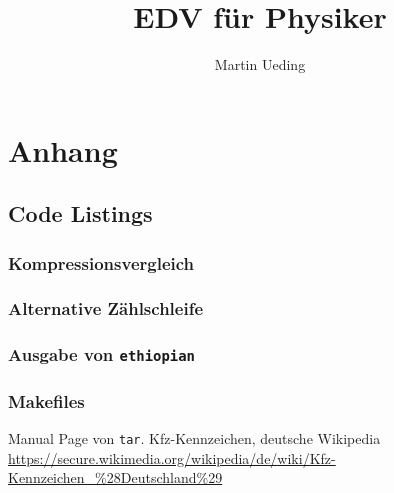 \documentclass[11pt]{report}
\title{EDV für Physiker}
\author{Martin Ueding}
\newcommand\gqq[1]{\glqq #1\grqq}
\begin{document}
\maketitle
\newpage

\tableofcontents
\newpage









\part{Anhang}
\begin{appendix}

\chapter{Code Listings}
\section{Kompressionsvergleich}
\label{listing:compression}


\section{Alternative Zählschleife}
\label{listing:zahlen2}


 


\section{Ausgabe von \texttt{ethiopian}}


\section{Makefiles}





\lstlistoflistings

\end{appendix}

\begin{thebibliography}{n}
 Manual Page von \texttt{tar}.
 \gqq{Kfz-Kennzeichen}, deutsche Wikipedia \url{https://secure.wikimedia.org/wikipedia/de/wiki/Kfz-Kennzeichen_\%28Deutschland\%29}
\end{thebibliography}
\end{document}
